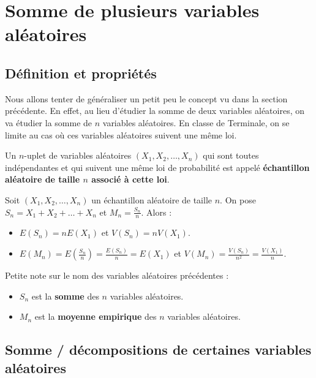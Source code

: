 	\section{Somme de plusieurs variables aléatoires}

	\subsection{Définition et propriétés}

	Nous allons tenter de généraliser un petit peu le concept vu dans la section précédente. En effet, au lieu d'étudier la somme de deux variables aléatoires, on va étudier la somme de $n$ variables aléatoires.
	\newpar
	En classe de Terminale, on se limite au cas où ces variables aléatoires suivent une même loi.

	\begin{formula}
		Un $n$-uplet de variables aléatoires $(X_1, X_2, \dots, X_n)$ qui sont toutes indépendantes et qui suivent une même loi de probabilité est appelé \textbf{échantillon aléatoire de taille $n$ associé à cette loi}.
	\end{formula}

	\begin{formula}
		Soit $(X_1, X_2, \dots, X_n)$ un échantillon aléatoire de taille $n$. On pose $S_n = X_1 + X_2 + \dots + X_n$ et $M_n = \frac{S_n}{n}$. Alors :
		\begin{itemize}
			\item $E(S_n) = nE(X_1)$ et $V(S_n) = nV(X_1)$.
			\item $E(M_n) = E\left(\frac{S_n}{n}\right) = \frac{E(S_n)}{n} = E(X_1)$ et $V(M_n) = \frac{V(S_n)}{n^2} = \frac{V(X_1)}{n}$.
		\end{itemize}
	\end{formula}

	\begin{tip}[Note]
		Petite note sur le nom des variables aléatoires précédentes :
		\begin{itemize}
			\item $S_n$ est la \textbf{somme} des $n$ variables aléatoires.
			\item $M_n$ est la \textbf{moyenne empirique} des $n$ variables aléatoires.
		\end{itemize}
	\end{tip}

	\subsection{Somme / décompositions de certaines variables aléatoires}

